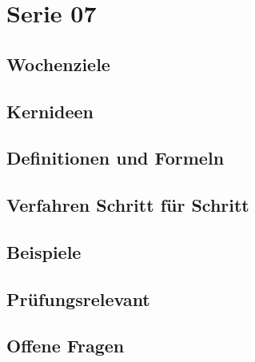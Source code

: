 \chapter{Serie 07}
\label{kap:serie07}

\section*{Wochenziele}
\begin{wochenziele}
\end{wochenziele}

\section{Kernideen}

\section{Definitionen und Formeln}

\section{Verfahren Schritt für Schritt}

\section{Beispiele}

\section{Prüfungsrelevant}

\section{Offene Fragen}
